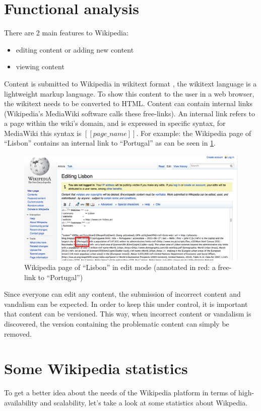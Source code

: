 \documentclass[12pt]{report}
\begin{document}
\section{Functional analysis}
There are 2 main features to Wikipedia:
\begin{itemize}
\item editing content or adding new content
\item viewing content
\end{itemize}
Content is submitted to Wikipedia in wikitext
format \cite{wikitext}, the wikitext language is a lightweight markup
language. To show this content to the user in a web browser, 
the wikitext needs to be converted to HTML.
Content can contain internal links (Wikipedia's MediaWiki software
calls these free-links). An internal link refers to a page within
the wiki's domain, and is expressed in specific syntax, for MediaWiki
this syntax is $[[page\_name]]$. For example: the Wikipedia page of ``Lisbon''
contains an internal link to ``Portugal'' as can be seen in
\ref{fig:lisbon_wikipedia}.

\begin{figure}[h!]
  \caption{Wikipedia page of ``Lisbon'' in edit mode (annotated in
    red: a free-link to ``Portugal'')}
  \label{fig:lisbon_wikipedia}
  \centering
    \includegraphics[scale=0.2]{pics/wikipedia_lisbon.png}
\end{figure}

Since everyone can edit any content, the submission of incorrect
content and vandalism can be expected. In
order to keep this under control, it is important that content can be
versioned.
This way, when incorrect content or vandalism is discovered, the
version containing the problematic content can simply be removed. \\

\section{Some Wikipedia statistics}
To get a better idea about the needs of the Wikipedia platform in
terms of high-availability and scalability, let's take a look at some
statistics about Wikpedia.
\end{document}
